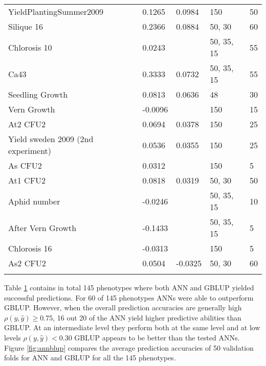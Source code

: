 \begin{longtable}{p{} p{} p{} p{}
    p{}}
  YieldPlantingSummer2009            & 0.1265  & 0.0984               & 150          & 50     \\
  Silique 16                         & 0.2366  & 0.0884               & 50, 30       & 60     \\
  Chlorosis 10                       & 0.0243  & \color{red}{0.088}   & 50, 35, 15   & 55     \\
  Ca43                               & 0.3333  & 0.0732               & 50, 35, 15   & 55     \\
  Seedling Growth                    & 0.0813  & 0.0636               & 48           & 30     \\
  Vern Growth                        & -0.0096 & \color{red}{0.0422}  & 150          & 15     \\
  At2 CFU2                           & 0.0694  & 0.0378               & 150          & 25     \\
  Yield sweden 2009 (2nd experiment) & 0.0536  & 0.0355               & 150          & 25     \\
  As CFU2                            & 0.0312  & \color{red}{0.035}   & 150          & 5      \\
  At1 CFU2                           & 0.0818  & 0.0319               & 50, 30       & 50     \\
  Aphid number                       & -0.0246 & \color{red}{0.029}   & 50, 35, 15   & 10     \\
  After Vern Growth                  & -0.1433 & \color{red}{0.0057}  & 50, 35, 15   & 5      \\
  Chlorosis 16                       & -0.0313 & \color{red}{-0.0121} & 150          & 5      \\
  As2 CFU2                           & 0.0504  & -0.0325              & 50, 30       & 60     \\
  \bottomrule
\label{tab:at_res}
\end{longtable}
\doublespacing


Table \ref{tab:at_res} contains in total 145 phenotypes where both ANN and GBLUP yielded
successful predictions. For 60 of 145 phenotypes ANNs were able to outperform
GBLUP. However, when the overall prediction accuracies are generally high
$\rho(y,\hat{y}) \geq 0.75$, 16 out 20 of the ANN yield higher predictive abilities than
GBLUP. At an intermediate level they perform both at the same level and at low levels
$\rho(y,\hat{y}) < 0.30$ GBLUP appears to be better than the tested ANNs.\\
Figure \ref{fig:annblup} compares the average prediction accuracies of 50 validation folds
for ANN and GBLUP for all the 145 phenotypes.

